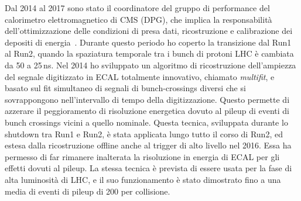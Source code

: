 \documentclass[11pt,twoside,a4paper]{article}
\begin{document}
Dal 2014 al 2017 sono stato il coordinatore del gruppo di performance
del calorimetro elettromagnetico di CMS (DPG), che implica la
responsabilit\`a dell'ottimizzazione delle condizioni di presa dati,
ricostruzione e calibrazione dei depositi di
energia~\cite{Khachatryan:2015iwa}. Durante questo periodo ho coperto
la transizione dal Run1 al Run2, quando la spaziatura temporale tra i
bunch di protoni LHC \`e cambiata da 50 a 25\,ns. Nel 2014 ho
sviluppato un algoritmo di ricostruzione dell'ampiezza del segnale
digitizzato in ECAL totalmente innovativo, chiamato \textit{multifit},
e basato sul fit simultaneo di segnali di bunch-crossings diversi che
si sovrappongono nell'intervallo di tempo della digitizzazione.
Questo permette di azzerare il peggioramento di risoluzione energetica
dovuto al pileup di eventi di bunch crossings vicini a quello
nominale.  Questa tecnica, sviluppata durante lo shutdown tra Run1 e
Run2, \`e stata applicata lungo tutto il corso di Run2, ed estesa
dalla ricostruzione offline anche al trigger di alto livello nel 2016.
Essa ha permesso di far rimanere inalterata la risoluzione in energia
di ECAL per gli effetti dovuti al pileup. La stessa tecnica \`e
prevista di essere usata per la fase di alta luminosit\`a di LHC, e il
suo funzionamento \`e stato dimostrato fino a una media di eventi di
pileup di 200 per collisione.






\end{document}
